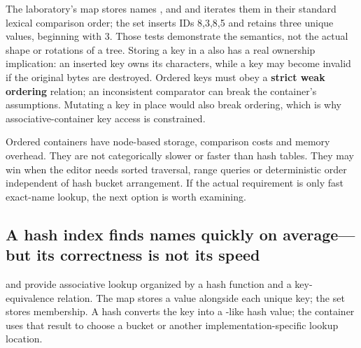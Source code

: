 The laboratory's map stores names ,  and  and iterates them in their standard lexical comparison order; the set inserts IDs 8,3,8,5 and retains three unique values, beginning with 3. Those tests demonstrate the semantics, not the actual shape or rotations of a tree. Storing a key in a  also has a real ownership implication: an inserted  key owns its characters, while a  key may become invalid if the original bytes are destroyed. Ordered keys must obey a \textbf{strict weak ordering} relation; an inconsistent comparator can break the container's assumptions. Mutating a key in place would also break ordering, which is why associative-container key access is constrained.

Ordered containers have node-based storage, comparison costs and memory overhead. They are not categorically slower or faster than hash tables. They may win when the editor needs sorted traversal, range queries or deterministic order independent of hash bucket arrangement. If the actual requirement is only fast exact-name lookup, the next option is worth examining.

\subsection{A hash index finds names quickly on average---but its correctness is not its speed}\label{01-foundations-i-ch006-a-hash-index-finds-names-quickly-on-averagebut-its-correctness-is-not-its-speed}

\hypertarget{01-foundations-i-ch006-a-hash-index-finds-names-quickly-on-averagebut-its-correctness-is-not-its-speed}{}

 and  provide associative lookup organized by a hash function and a key-equivalence relation. The map stores a value alongside each unique key; the set stores membership. A hash converts the key into a -like hash value; the container uses that result to choose a bucket or another implementation-specific lookup location.

